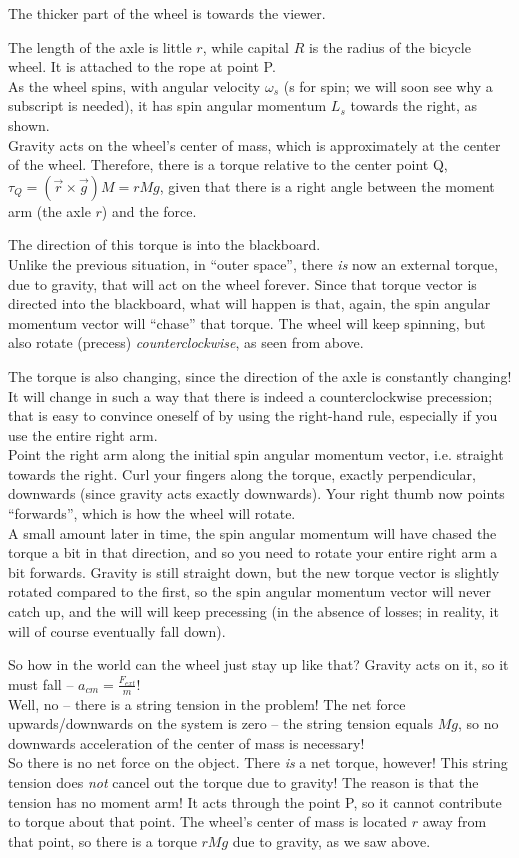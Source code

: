 \documentclass[8.01x]{subfiles}
\begin{document}
The thicker part of the wheel is towards the viewer.

The length of the axle is little $r$, while capital $R$ is the radius of the bicycle wheel. It is attached to the rope at point P.\\
As the wheel spins, with angular velocity $\omega_s$ (s for spin; we will soon see why a subscript is needed), it has spin angular momentum $L_s$ towards the right, as shown.\\
Gravity acts on the wheel's center of mass, which is approximately at the center of the wheel. Therefore, there is a torque relative to the center point Q, $\tau_Q = (\vec{r} \times \vec{g}) M = r M g$, given that there is a right angle between the moment arm (the axle $r$) and the force.

The direction of this torque is into the blackboard.\\
Unlike the previous situation, in ``outer space'', there \emph{is} now an external torque, due to gravity, that will act on the wheel forever. Since that torque vector is directed into the blackboard, what will happen is that, again, the spin angular momentum vector will ``chase'' that torque. The wheel will keep spinning, but also rotate (precess) \emph{counterclockwise}, as seen from above.

The torque is also changing, since the direction of the axle is constantly changing! It will change in such a way that there is indeed a counterclockwise precession; that is easy to convince oneself of by using the right-hand rule, especially if you use the entire right arm.\\
Point the right arm along the initial spin angular momentum vector, i.e. straight towards the right. Curl your fingers along the torque, exactly perpendicular, downwards (since gravity acts exactly downwards). Your right thumb now points ``forwards'', which is how the wheel will rotate.\\
A small amount later in time, the spin angular momentum will have chased the torque a bit in that direction, and so you need to rotate your entire right arm a bit forwards. Gravity is still straight down, but the new torque vector is slightly rotated compared to the first, so the spin angular momentum vector will never catch up, and the will will keep precessing (in the absence of losses; in reality, it will of course eventually fall down).

So how in the world can the wheel just stay up like that? Gravity acts on it, so it must fall -- $\displaystyle a_{cm} = \frac{F_{ext}}{m}$!\\
Well, no -- there is a string tension in the problem! The net force upwards/downwards on the system is zero -- the string tension equals $M g$, so no downwards acceleration of the center of mass is necessary!\\
So there is no net force on the object. There \emph{is} a net torque, however! This string tension does \emph{not} cancel out the torque due to gravity! The reason is that the tension has no moment arm! It acts through the point P, so it cannot contribute to torque about that point. The wheel's center of mass is located $r$ away from that point, so there is a torque $r M g$ due to gravity, as we saw above.
\end{document}
